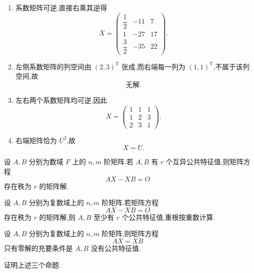 \begin{solution}
\leavevmode
\begin{enumerate}
  \item 系数矩阵可逆,直接右乘其逆得
  \[
  \boxed{
  X=
  \begin{pmatrix}
  \dfrac12&-11&7\\
  1&-27&17\\
  \dfrac32&-35&22
  \end{pmatrix}
  }.
  \]
  \item 左侧系数矩阵的列空间由 $(2,3)^{\mathsf T}$ 张成,而右端每一列为 $(1,1)^{\mathsf T}$,不属于该列空间,故
  \[
  \boxed{\text{无解}}.
  \]
  \item 左右两个系数矩阵均可逆,因此
  \[
  \boxed{
  X=
  \begin{pmatrix}
  1&1&1\\
  1&2&3\\
  2&3&1
  \end{pmatrix}
  }.
  \]
  \item 右端矩阵恰为 $U^2$,故
  \[
  \boxed{X=U}.
  \]
\end{enumerate}
\end{solution}

\begin{proposition}[\markstar]
设 $A,B$ 分别为数域 $F$ 上的 $n,m$ 阶矩阵.若 $A,B$ 有 $r$ 个互异公共特征值,则矩阵方程
\[
AX-XB=O
\]
存在秩为 $r$ 的矩阵解.
\end{proposition}

\begin{proposition}[\markstar]
设 $A,B$ 分别为复数域上的 $n,m$ 阶矩阵.若矩阵方程
\[
AX-XB=O
\]
存在秩为 $r$ 的矩阵解,则 $A,B$ 至少有 $r$ 个公共特征值,重根按重数计算.
\end{proposition}

\begin{proposition}[\marktwostar]
设 $A,B$ 分别为复数域上的 $n,m$ 阶矩阵,则矩阵方程
\[
AX=XB
\]
只有零解的充要条件是 $A,B$ 没有公共特征值.
\end{proposition}

\begin{example}
证明上述三个命题.
\end{example}
\exampleblank

